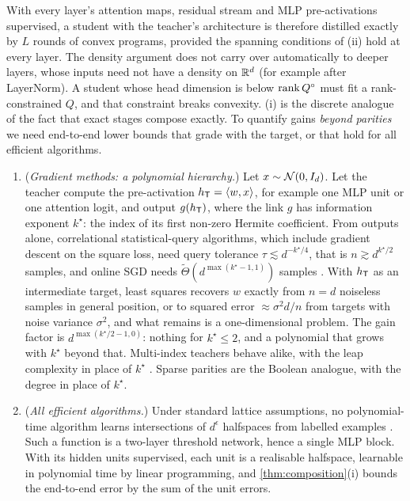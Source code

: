 \noindent
With every layer's attention maps, residual stream and MLP pre-activations supervised, a student with the teacher's
architecture is therefore distilled exactly by $L$ rounds of convex programs, provided the spanning conditions of (ii)
hold at every layer. The density argument does not carry over automatically to deeper layers, whose inputs need not
have a density on $\mathbb{R}^d$ (for example after LayerNorm). A student whose head dimension is below $\operatorname{rank} Q^\circ$ must fit
a rank-constrained $Q$, and that constraint breaks convexity. (i) is the discrete analogue of the fact that exact
stages compose exactly. To quantify gains \emph{beyond parities} we need end-to-end lower bounds that grade with the
target, or that hold for all efficient algorithms.

\begin{proposition}\label{prop:graded}
\Kn
\begin{enumerate}[label=(\alph*),nosep]
\item (\emph{Gradient methods: a polynomial hierarchy.}) Let $x\sim\mathcal{N}(0,I_d)$. Let the teacher compute the pre-activation
$h_{\mathsf{T}}=\langle w,x\rangle$, for example one MLP unit or one attention logit, and output $g(h_{\mathsf{T}})$, where the link $g$ has
information exponent $k^\star$: the index of its first non-zero Hermite coefficient. From outputs alone, correlational
statistical-query algorithms, which include gradient descent on the square loss, need query tolerance
$\tau\lesssim d^{-k^\star/4}$, that is $n\gtrsim d^{k^\star/2}$ samples, and online SGD needs $\tilde\Theta(d^{\max(k^\star-1,1)})$ samples
\citep{benarous2021online,damian2023smoothing}. With $h_{\mathsf{T}}$ as an intermediate target, least squares recovers $w$ exactly from
$n=d$ noiseless samples in general position, or to squared error $\approx\sigma^2d/n$ from targets with noise variance $\sigma^2$,
and what remains is a one-dimensional problem. The gain factor is $d^{\max(k^\star/2-1,0)}$: nothing for $k^\star\le2$, and a
polynomial that grows with $k^\star$ beyond that. Multi-index teachers behave alike, with the leap complexity in place of
$k^\star$ \citep{abbe2023sgd}. Sparse parities are the Boolean analogue, with the degree in place of $k^\star$.
\item (\emph{All efficient algorithms.}) Under standard lattice assumptions, no polynomial-time algorithm learns intersections of
$d^{\epsilon}$ halfspaces from labelled examples \citep{klivans2009cryptographic}. Such a function is a two-layer threshold network,
hence a single MLP block. With its hidden units supervised, each unit is a realisable halfspace, learnable in polynomial
time by linear programming, and \cref{thm:composition}(i) bounds the end-to-end error by the sum of the unit errors.
\end{enumerate}
\end{proposition}
